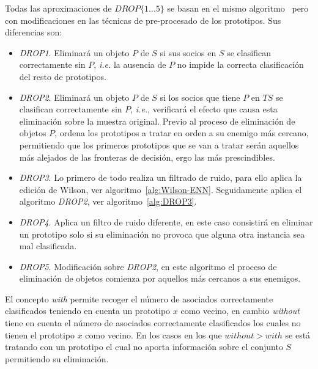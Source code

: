 Todas las aproximaciones de $DROP\lbrace 1\dots5\rbrace$ se basan en el mismo algoritmo~\cite{wilson2000reduction} pero con modificaciones en las técnicas de pre-procesado de los prototipos. Sus diferencias son:
\begin{itemize}
\item \textit{DROP1}. Eliminará un objeto $P$ de $S$ si sus socios en $S$ se clasifican correctamente sin $P$, \textit{i.e.} la ausencia de $P$ no impide la correcta clasificación del resto de prototipos.
\item \textit{DROP2}. Eliminará un objeto $P$ de $S$ si los socios que tiene $P$ en $TS$ se clasifican correctamente sin $P$, \textit{i.e.}, verificará el efecto que causa esta eliminación sobre la muestra original. Previo al proceso de eliminación de objetos $P$, ordena los prototipos a tratar en orden a su enemigo más cercano, permitiendo que los primeros prototipos que se van a tratar serán aquellos más alejados de las fronteras de decisión, ergo las más prescindibles.
\item \textit{DROP3}. Lo primero de todo realiza un filtrado de ruido, para ello aplica la edición de Wilson, ver algoritmo~\ref{alg:Wilson-ENN}. Seguidamente aplica el algoritmo \textit{DROP2}, ver algoritmo~\ref{alg:DROP3}.
\item \textit{DROP4}. Aplica un filtro de ruido diferente, en este caso consistirá en eliminar un prototipo solo si su eliminación no provoca que alguna otra instancia sea mal clasificada.
\item \textit{DROP5}. Modificación sobre \textit{DROP2}, en este algoritmo el proceso de eliminación de objetos comienza por aquellos más cercanos a sus enemigos. 
\end{itemize}

El concepto \textit{with} permite recoger el número de asociados correctamente clasificados teniendo en cuenta un prototipo $x$ como vecino, en cambio \textit{without} tiene en cuenta el número de asociados correctamente clasificados los cuales no tienen el prototipo $x$ como vecino. En los casos en los que $without > with$ se está tratando con un prototipo el cual no aporta información sobre el conjunto $S$ permitiendo su eliminación.

